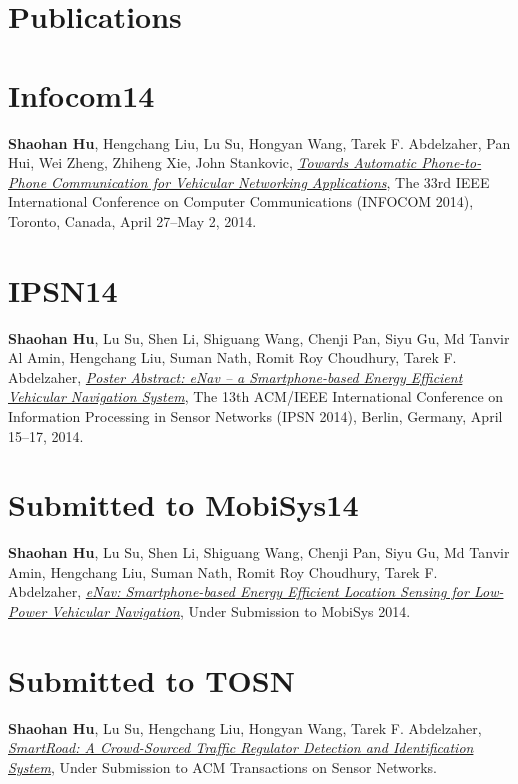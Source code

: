 \section{\sc Publications}

\section{\sc Infocom14}\hypertarget{hu2014infocom}{}
\textbf{Shaohan Hu}, Hengchang Liu, Lu Su, Hongyan Wang, Tarek F.
Abdelzaher, Pan Hui, Wei Zheng, Zhiheng Xie, John Stankovic,
\href{}{\emph{Towards Automatic Phone-to-Phone Communication for Vehicular
  Networking Applications}}, \textsf{The 33rd IEEE International Conference on Computer Communications (INFOCOM 2014)}, Toronto, Canada, April 27--May 2, 2014.

\section{\sc IPSN14}\hypertarget{hu2014ipsn}{}
\textbf{Shaohan Hu}, Lu Su, Shen Li, Shiguang Wang, Chenji Pan, Siyu Gu, Md Tanvir Al Amin, Hengchang Liu, Suman Nath, Romit Roy Choudhury, Tarek F.
Abdelzaher, \href{}{\emph{Poster Abstract: eNav -- a Smartphone-based Energy Efficient Vehicular Navigation System}}, \textsf{The 13th
  ACM/IEEE International Conference on Information Processing in
  Sensor Networks (IPSN 2014)}, Berlin, Germany, April 15--17, 2014.

\section{\sc Submitted to MobiSys14}\hypertarget{hu2014mobisys}{}
\textbf{Shaohan Hu}, Lu Su, Shen Li, Shiguang Wang, Chenji Pan, Siyu Gu, Md Tanvir Amin,
Hengchang Liu, Suman Nath, Romit Roy Choudhury, Tarek F. Abdelzaher, \href{}{\emph{eNav:
  Smartphone-based Energy Efficient Location Sensing for Low-Power
  Vehicular Navigation}}, \textsf{Under Submission to MobiSys 2014}. %

\section{\sc Submitted to TOSN}\hypertarget{hu2013tosn}{}
\textbf{Shaohan Hu}, Lu Su, Hengchang Liu, Hongyan Wang, Tarek F.
Abdelzaher, \href{}{\emph{SmartRoad: A Crowd-Sourced Traffic
  Regulator Detection and Identification System}}, \textsf{Under Submission to ACM Transactions on Sensor Networks}. %

